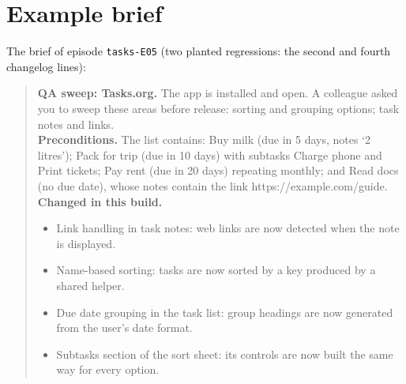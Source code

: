 \documentclass[11pt]{article}
\begin{document}



\appendix
\section{Example brief}\label{app:brief}
The brief of episode \texttt{tasks-E05} (two planted regressions: the second and fourth changelog
lines):
\begin{quote}\small
\textbf{QA sweep: Tasks.org.} The app is installed and open. A colleague asked you to sweep these
areas before release: sorting and grouping options; task notes and links.\\[2pt]
\textbf{Preconditions.} The list contains: Buy milk (due in 5 days, notes `2 litres'); Pack for
trip (due in 10 days) with subtasks Charge phone and Print tickets; Pay rent (due in 20 days)
repeating monthly; and Read docs (no due date), whose notes contain the link
https://example.com/guide.\\[2pt]
\textbf{Changed in this build.}
\begin{itemize}
  \item Link handling in task notes: web links are now detected when the note is displayed.
  \item Name-based sorting: tasks are now sorted by a key produced by a shared helper.
  \item Due date grouping in the task list: group headings are now generated from the user's date
    format.
  \item Subtasks section of the sort sheet: its controls are now built the same way for every option.
\end{itemize}
\end{quote}
\end{document}
